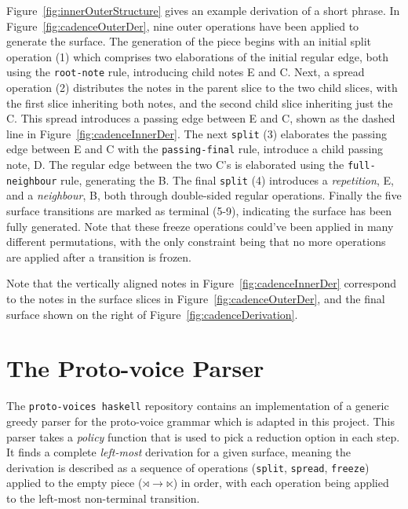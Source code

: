 \documentclass[12pt,a4paper,twoside,openany]{report} \usepackage[pdfborder={0 0 0}]{hyperref}    %
\theoremstyle{definition} \newtheorem{definition}{Definition}[section]
\begin{document}
Figure~\ref{fig:innerOuterStructure} gives an example derivation of a short phrase. 
In Figure~\ref{fig:cadenceOuterDer}, nine outer operations have been applied to generate the surface.
The generation of the piece begins with an initial split operation (1) which comprises two elaborations of the initial
regular edge, both using the \texttt{root-note} rule, introducing child notes E and C. 
Next, a spread operation (2) distributes the notes in the parent slice to the two child slices, with the first slice inheriting both notes, and the second child slice inheriting just the C. 
This spread introduces a passing edge between E and C, shown as the dashed line in Figure~\ref{fig:cadenceInnerDer}. 
The next \texttt{split} (3) elaborates the passing edge between E and
C with the \texttt{passing-final} rule,
introduce a child passing note, D. The regular edge between the two C's is elaborated using the
\texttt{full-neighbour} rule, generating the B. The final \texttt{split} (4) introduces a \textit{repetition}, E, and
a \textit{neighbour}, B, both through double-sided regular operations. Finally the five surface transitions are marked
as terminal (5-9), indicating the surface has been fully generated. Note that these freeze operations could've been
applied in many different permutations, with the only constraint being that no more operations are applied after a transition is frozen.

Note that the vertically aligned notes in Figure~\ref{fig:cadenceInnerDer}
correspond to the notes in the surface slices in Figure~\ref{fig:cadenceOuterDer}, and the final surface shown on the
right of Figure~\ref{fig:cadenceDerivation}. 


\section{The Proto-voice Parser} %
\label{sec:protoVoiceParser}

The \texttt{proto-voices haskell} repository contains an implementation of a generic greedy parser for the proto-voice
grammar which is adapted in
this project. This parser takes a \textit{policy} function that is used to pick a reduction option in each step. It
finds a complete \textit{left-most} derivation for a given surface, meaning the derivation is described as a sequence of
operations (\texttt{split}, \texttt{spread}, \texttt{freeze}) applied to the empty piece ($\rtimes \to \ltimes$) in
order, with each operation being applied to the left-most non-terminal transition. 
\end{document}

